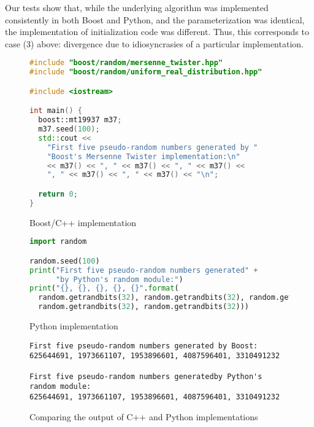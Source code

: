 \documentclass{article}
\begin{document}
Our tests show that, while the underlying algorithm was implemented consistently in both Boost and Python, and the parameterization was identical, the implementation of initialization code was different. Thus, this corresponds to case (3) above: divergence due to idiosyncrasies of a particular implementation.

\begin{figure}
\begin{lstlisting}[language=C++]
#include "boost/random/mersenne_twister.hpp"
#include "boost/random/uniform_real_distribution.hpp"

#include <iostream>

int main() {
  boost::mt19937 m37;
  m37.seed(100);
  std::cout <<
    "First five pseudo-random numbers generated by "
    "Boost's Mersenne Twister implementation:\n"
    << m37() << ", " << m37() << ", " << m37() <<
    ", " << m37() << ", " << m37() << "\n";

  return 0;
}
\end{lstlisting}
\caption{Boost/C++ implementation}
\label{fig:01}
\end{figure}

\begin{figure}
\begin{lstlisting}[language=Python]
import random

random.seed(100)
print("First five pseudo-random numbers generated" +
      "by Python's random module:")
print("{}, {}, {}, {}, {}".format(
  random.getrandbits(32), random.getrandbits(32), random.getrandbits(32),
  random.getrandbits(32), random.getrandbits(32)))
\end{lstlisting}
\caption{Python implementation}
\label{fig:02}
\end{figure}

\begin{figure}
\begin{lstlisting}
First five pseudo-random numbers generated by Boost:
625644691, 1973661107, 1953896601, 4087596401, 3310491232

First five pseudo-random numbers generatedby Python's random module:
625644691, 1973661107, 1953896601, 4087596401, 3310491232
\end{lstlisting}
\caption{Comparing the output of C++ and Python implementations}
\label{fig:03}
\end{figure}



\end{document}
